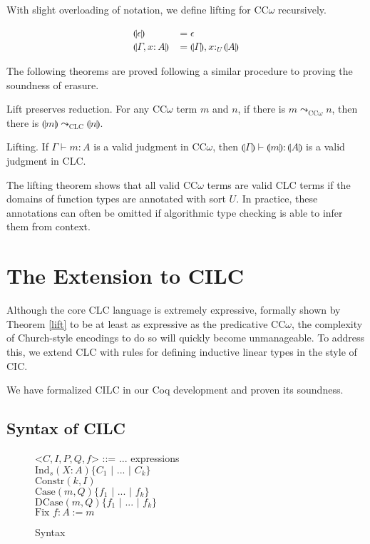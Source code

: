 \documentclass[sigplan,screen,review,anonymous]{acmart}
\newcommand{\indalt}[1][2]{\\\hspace*{-1.2em}\textbar\quad}
\newcommand{\ind}[1]{\text{Ind}_{#1}}
\newcommand{\constr}{\text{Constr}}
\newcommand{\case}{\text{Case}}
\newcommand{\dcase}{\text{DCase}}
\newcommand{\fix}{\text{Fix }}
\newcommand{\sep}{\text{ | }}
\newcommand{\utype}{:_{\scriptscriptstyle U}}
\newcommand{\step}{\leadsto}
\newcommand{\lift}[1]{\llparenthesis #1 \rrparenthesis}
\begin{document}
With slight overloading of notation, we define lifting for CC$\omega$ recursively.
\begin{definition}
  \begin{align*}
    \lift{\epsilon}      & = \epsilon                         \\
    \lift{\Gamma, x : A} & = \lift{\Gamma}, x \utype \lift{A}
  \end{align*}
\end{definition}

The following theorems are proved following a similar procedure to proving the soundness of erasure.
\begin{theorem}
  Lift preserves reduction. For any CC$\omega$ term $m$ and $n$, if there is $m \step_{\scriptscriptstyle \text{CC}\omega} n$, then there is $\lift{m} \step_{\scriptscriptstyle \text{CLC}} \lift{n}$.
\end{theorem}

\begin{theorem} \label{lift}
  Lifting. If $\Gamma \vdash m : A$ is a valid judgment in CC$\omega$, then $\lift{\Gamma} \vdash \lift{m} : \lift{A}$ is a valid judgment in CLC.
\end{theorem}

The lifting theorem shows that all valid CC$\omega$ terms are valid CLC terms if the domains of function types are annotated with sort $U$. In practice, these annotations can often be omitted if algorithmic type checking is able to infer them from context.

\section{The Extension to CILC}
Although the core CLC language is extremely expressive, formally shown by Theorem \ref{lift} to be at least as expressive as the predicative CC$\omega$, the complexity of Church-style encodings to do so will quickly become unmanageable. To address this, we extend CLC with rules for defining inductive linear types in the style of CIC.

We have formalized CILC in our Coq development and proven its soundness.

\subsection{Syntax of CILC}
\begin{figure}[h]
  \caption{Syntax}
  \begin{grammar}
    <$C,I,P,Q,f$> ::= ... \hspace*{10em} expressions
    \indalt $\ind{s}(X : A)\{C_1 \sep ... \sep C_k\}$
    \indalt $\constr(k, I)$
    \indalt $\case(m, Q)\{f_1 \sep ... \sep f_k \}$
    \indalt $\dcase(m, Q)\{f_1 \sep ... \sep f_k \}$
    \indalt $\fix f : A := m$
  \end{grammar}
  \Description{}
  \label{syntax2}
\end{figure}
\end{document}
